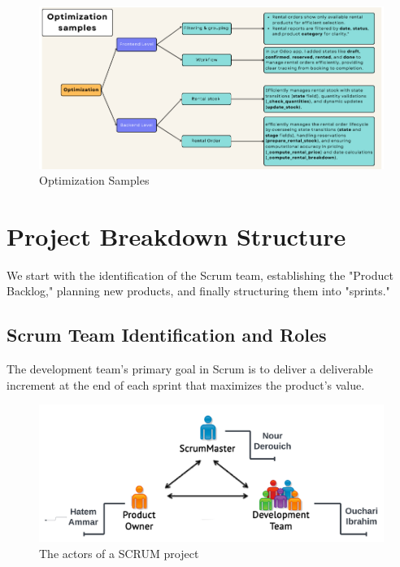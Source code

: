 \begin{itemize}
\begin{figure}[htbp]
    \centering
    \includegraphics[width=1.1\textwidth]{media/optimization.png}
    \caption{Optimization Samples}
    \label{fig:optimization}
\end{figure}

\end{itemize}


\section{Project Breakdown Structure}

We start with the identification of the Scrum team, establishing the "Product Backlog," planning new products, and finally structuring them into "sprints."

\subsection{Scrum Team Identification and Roles}

The development team's primary goal in Scrum is to deliver a deliverable increment at the end of each sprint that maximizes the product's value.

\begin{figure}[h]
    \centering
    \includegraphics[width=1\textwidth]{media/Scrum_team.png}
    \caption{The actors of a SCRUM project}
    \label{fig:scrum-actors}
\end{figure}
\newpage

